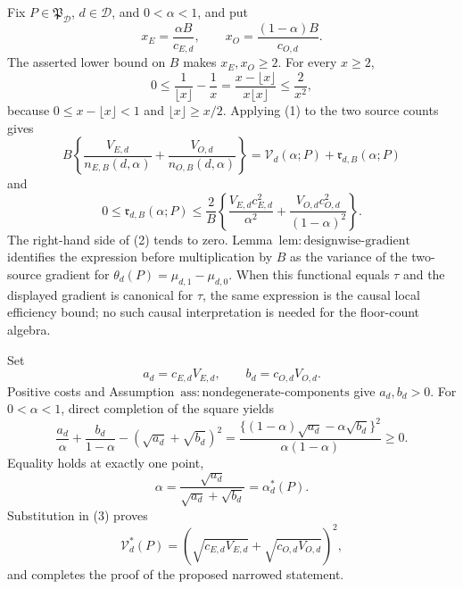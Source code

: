 Fix \(P\in\mathfrak P_{\mathcal D}\), \(d\in\mathcal D\), and \(0<\alpha<1\), and put
\[
 x_E=\frac{\alpha B}{c_{E,d}},
 \qquad
 x_O=\frac{(1-\alpha)B}{c_{O,d}}.
\]
The asserted lower bound on \(B\) makes \(x_E,x_O\ge2\).  For every \(x\ge2\),
\[
 0\le \frac1{\lfloor x\rfloor}-\frac1x
 =\frac{x-\lfloor x\rfloor}{x\lfloor x\rfloor}
 \le \frac2{x^2},                                           \tag{1}
\]
because \(0\le x-\lfloor x\rfloor<1\) and \(\lfloor x\rfloor\ge x/2\).  Applying (1) to the two source counts gives
\[
 B\left\{\frac{V_{E,d}}{n_{E,B}(d,\alpha)}
 +\frac{V_{O,d}}{n_{O,B}(d,\alpha)}\right\}
 =\mathcal V_d(\alpha;P)+\mathfrak r_{d,B}(\alpha;P)
\]
and
\[
 0\le\mathfrak r_{d,B}(\alpha;P)
 \le\frac2B\left\{
 \frac{V_{E,d}c_{E,d}^2}{\alpha^2}
 +\frac{V_{O,d}c_{O,d}^2}{(1-\alpha)^2}\right\}.           \tag{2}
\]
The right-hand side of (2) tends to zero.  Lemma~\(\mathrm{lem{:}designwise\text{-}gradient}\) identifies the expression before multiplication by \(B\) as the variance of the two-source gradient for \(\theta_d(P)=\mu_{d,1}-\mu_{d,0}\).  When this functional equals \(\tau\) and the displayed gradient is canonical for \(\tau\), the same expression is the causal local efficiency bound; no such causal interpretation is needed for the floor-count algebra.

Set
\[
 a_d=c_{E,d}V_{E,d},
 \qquad
 b_d=c_{O,d}V_{O,d}.
\]
Positive costs and Assumption~\(\mathrm{ass{:}nondegenerate\text{-}components}\) give \(a_d,b_d>0\).  For \(0<\alpha<1\), direct completion of the square yields
\[
 \frac{a_d}{\alpha}+\frac{b_d}{1-\alpha}
 -(\sqrt{a_d}+\sqrt{b_d})^2
 =\frac{\{(1-\alpha)\sqrt{a_d}-\alpha\sqrt{b_d}\}^2}
        {\alpha(1-\alpha)}\ge0.                             \tag{3}
\]
Equality holds at exactly one point,
\[
 \alpha=\frac{\sqrt{a_d}}{\sqrt{a_d}+\sqrt{b_d}}
 =\alpha_d^*(P).
\]
Substitution in (3) proves
\[
 \mathcal V_d^*(P)
 =(\sqrt{c_{E,d}V_{E,d}}+\sqrt{c_{O,d}V_{O,d}})^2,
\]
and completes the proof of the proposed narrowed statement.